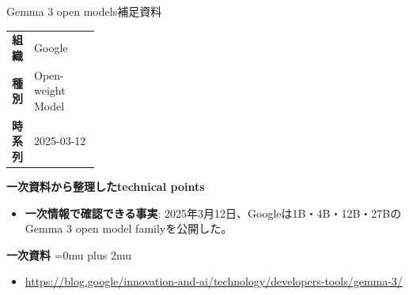 \begin{technicalnote}{Gemma 3 open models}{補足資料}
\begingroup
\begin{tabularx}{\linewidth}{@{}>{\bfseries}p{0.22\linewidth}X@{}}
組織 & Google \\
種別 & Open-weight Model \\
時系列 & 2025-03-12 \\
\end{tabularx}
\smallskip
\begin{minipage}{\linewidth}
{\bfseries 一次資料から整理したtechnical points}
\begin{itemize}[leftmargin=1.5em,itemsep=0.35em]
\item \textbf{一次情報で確認できる事実}: 2025年3月12日、Googleは1B・4B・12B・27BのGemma 3 open model familyを公開した。
\end{itemize}
\begin{samepage}
{\bfseries 一次資料}
\begingroup\sloppy
\Urlmuskip=0mu plus 2mu\relax
\begin{itemize}[leftmargin=1.5em,itemsep=0.25em]
\item {\scriptsize\url{https://blog.google/innovation-and-ai/technology/developers-tools/gemma-3/}}
\end{itemize}
\endgroup
\end{samepage}
\end{minipage}
\endgroup
\end{technicalnote}
\medskip

